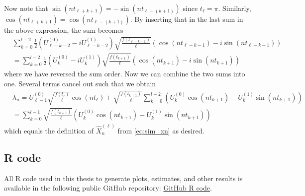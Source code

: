 \documentclass{article}
\begin{document}
Now note that $\sin\left(n t_{\ell+k+1}\right) = -\sin(nt_{\ell-(k+1)})$ since $t_\ell = \pi$. Similarly, $\cos\left(n t_{\ell+k+1}\right) = \cos(nt_{\ell-(k+1)})$. By inserting that in the last sum in the above expression, the sum becomes
\begin{align*}
&\sum_{k=0}^{l-2}\frac{1}{2} \left( U^{(0)}_{\ell-k-2}- i U^{(1)}_{\ell-k-2} \right) \sqrt{\frac{f(t_{\ell-k-1})}{\ell}} \left( \cos\left(n t_{\ell-k-1}\right) - i\sin\left(n t_{\ell-k-1}\right)\right)\\
& =\sum_{k=0}^{l-2}\frac{1}{2} \left( U^{(0)}_{k}- i U^{(1)}_{k} \right) \sqrt{\frac{f(t_{k+1})}{\ell}} \left( \cos\left(n t_{k+1}\right) - i\sin\left(n t_{k+1}\right)\right)
\end{align*}
where we have reversed the sum order. Now we can combine the two sums into one. Several terms cancel out such that we obtain
\begin{align*}
&\lambda_n = U^{(0)}_{\ell-1} \sqrt{\frac{f(t_\ell)}{\ell}}\cos(nt_\ell)+ \sqrt{\frac{f(t_{k+1})}{\ell}} \sum_{k=0}^{l-2} \left(U^{(0)}_k\cos\left(n t_{k+1}\right)-U^{(1)}_{k}\sin\left(n t_{k+1}\right)\right)\\
& = \sum_{k=0}^{l-1}\sqrt{\frac{f(t_{k+1})}{\ell}}\left(U^{(0)}_k\cos\left(n t_{k+1}\right)-U^{(1)}_{k}\sin\left(n t_{k+1}\right)\right)
\end{align*}
which equals the definition of $\hat{X}_n^{(\ell)}$ from \eqref{eq:sim_xn} as desired.

\subsection{R code}
All R code used in this thesis to generate plots, estimates, and other results is available in the following public GitHub repository: \href{https://github.com/PeterHjortAnd/master_thesis}{GitHub R code}.

\newpage
{}


\end{document}
